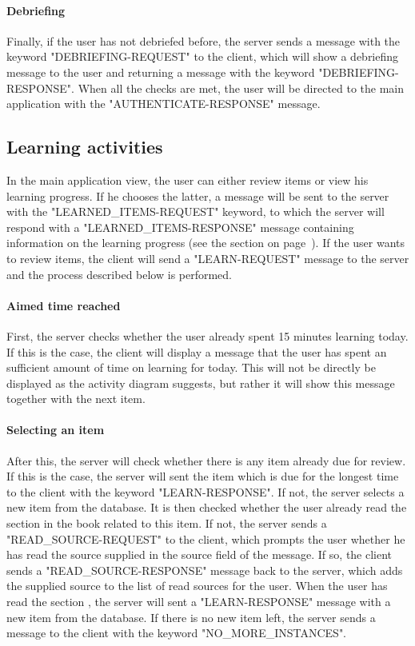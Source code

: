 \paragraph{Debriefing} Finally, if the user has not debriefed before, the server sends a message with the keyword "DEBRIEFING-REQUEST" to the client, which will show a debriefing message to the user and returning a message with the keyword "DEBRIEFING-RESPONSE". When all the checks are met, the user will be directed to the main application with the "AUTHENTICATE-RESPONSE" message.

\subsection{Learning activities}

In the main application view, the user can either review items or view his learning progress. If he chooses the latter, a message will be sent to the server with the "LEARNED\_ITEMS-REQUEST" keyword, to which the server will respond with a "LEARNED\_ITEMS-RESPONSE" message containing information on the learning progress (see the  section on page~\pageref{sec:progress}). If the user wants to review items, the client will send a "LEARN-REQUEST" message to the server and the process described below is performed.

\paragraph{Aimed time reached} First, the server checks whether the user already spent 15 minutes learning today. If this is the case, the client will display a message that the user has spent an sufficient amount of time on learning for today. This will not be directly be displayed as the activity diagram suggests, but rather it will show this message together with the next item.

\paragraph{Selecting an item} After this, the server will check whether there is any item already due for review. If this is the case, the server will sent the item which is due for the longest time to the client with the keyword "LEARN-RESPONSE". If not, the server selects a new item from the database. It is then checked whether the user already read the section in the book related to this item. If not, the server sends a "READ\_SOURCE-REQUEST" to the client, which prompts the user whether he has read the source supplied in the source field of the message. If so, the client sends a "READ\_SOURCE-RESPONSE" message back to the server, which adds the supplied source to the list of read sources for the user. When the user has read the section , the server will sent a "LEARN-RESPONSE" message with a new item from the database. If there is no new item left, the server sends a message to the client with the keyword "NO\_MORE\_INSTANCES".


